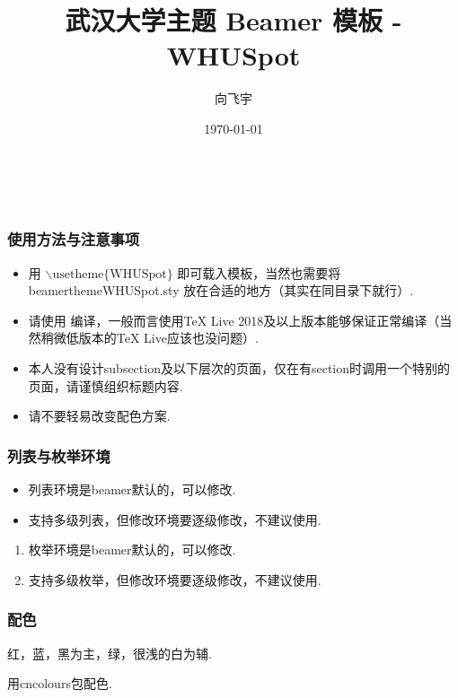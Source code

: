 \documentclass{beamer}
\title{武汉大学主题 Beamer 模板 - WHUSpot}
\author{向飞宇}
\institute{武汉大学}
\date{\today}
\begin{document}
\begin{frame}
    \frametitle{\\}
    \titlepage
\end{frame}

\begin{frame}
    \frametitle{使用方法与注意事项}
    \begin{itemize}
        \item 用 $\backslash \mbox{usetheme\{WHUSpot\}}$ 即可载入模板，当然也需要将 beamerthemeWHUSpot.sty 放在合适的地方（其实在同目录下就行）.
        \item 请使用  编译，一般而言使用\alert{TeX Live 2018}及以上版本能够保证正常编译（当然稍微低版本的TeX Live应该也没问题）.
        \item 本人\alert{没有设计subsection及以下层次}的页面，仅在有section时调用一个特别的页面，请谨慎组织标题内容.
        \item 请不要轻易改变配色方案.
    \end{itemize}
\end{frame}

\begin{frame}
    \frametitle{列表与枚举环境}
    \begin{itemize}
        \item 列表环境是beamer默认的，可以修改. \pause
        \item 支持多级列表，但修改环境要逐级修改，\alert{不建议}使用. \pause
    \end{itemize}

    \begin{enumerate}
        \item 枚举环境是beamer默认的，可以修改. \pause
        \item 支持多级枚举，但修改环境要逐级修改，\alert{不建议}使用.
    \end{enumerate}
\end{frame}

\begin{frame}
    \frametitle{配色}
    红，蓝，黑为主，绿，很浅的白为辅.

    用cncolours包配色.
\end{frame}
\end{document}

